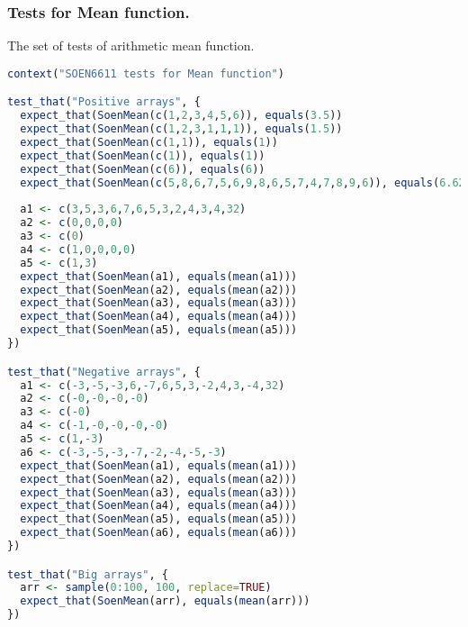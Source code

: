 \documentclass[12pt]{article}
\begin{document}
\subsubsection{Tests for Mean function.}
The set of tests of arithmetic mean function.
\begin{lstlisting}[language=R]
context("SOEN6611 tests for Mean function")

test_that("Positive arrays", {
  expect_that(SoenMean(c(1,2,3,4,5,6)), equals(3.5))
  expect_that(SoenMean(c(1,2,3,1,1,1)), equals(1.5))
  expect_that(SoenMean(c(1,1)), equals(1))
  expect_that(SoenMean(c(1)), equals(1))
  expect_that(SoenMean(c(6)), equals(6))
  expect_that(SoenMean(c(5,8,6,7,5,6,9,8,6,5,7,4,7,8,9,6)), equals(6.625))
  
  a1 <- c(3,5,3,6,7,6,5,3,2,4,3,4,32)
  a2 <- c(0,0,0,0)
  a3 <- c(0)
  a4 <- c(1,0,0,0,0)
  a5 <- c(1,3)
  expect_that(SoenMean(a1), equals(mean(a1)))
  expect_that(SoenMean(a2), equals(mean(a2)))
  expect_that(SoenMean(a3), equals(mean(a3)))
  expect_that(SoenMean(a4), equals(mean(a4)))
  expect_that(SoenMean(a5), equals(mean(a5)))
})

test_that("Negative arrays", {
  a1 <- c(-3,-5,-3,6,-7,6,5,3,-2,4,3,-4,32)
  a2 <- c(-0,-0,-0,-0)
  a3 <- c(-0)
  a4 <- c(-1,-0,-0,-0,-0)
  a5 <- c(1,-3)
  a6 <- c(-3,-5,-3,-7,-2,-4,-5,-3)
  expect_that(SoenMean(a1), equals(mean(a1)))
  expect_that(SoenMean(a2), equals(mean(a2)))
  expect_that(SoenMean(a3), equals(mean(a3)))
  expect_that(SoenMean(a4), equals(mean(a4)))
  expect_that(SoenMean(a5), equals(mean(a5)))
  expect_that(SoenMean(a6), equals(mean(a6)))
})

test_that("Big arrays", {
  arr <- sample(0:100, 100, replace=TRUE)
  expect_that(SoenMean(arr), equals(mean(arr)))
})
\end{lstlisting}
\end{document}
